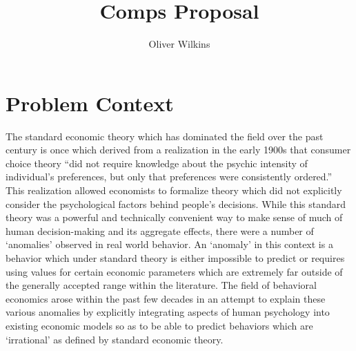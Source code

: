 \documentclass[10pt,twocolumn]{article}
\title{Comps Proposal}
\author{Oliver Wilkins}
\affiliation{Occidental College}
\begin{document}
\maketitle

\section{Problem Context}
The standard economic theory which has dominated the field over the past century is once which derived from a realization in the early 1900s that consumer choice theory “did not require knowledge about the psychic intensity of individual’s preferences, but only that preferences were consistently ordered.”\cite{lehr} This realization allowed economists to formalize theory which did not explicitly consider the psychological factors behind people’s decisions. While this standard theory was a powerful and technically convenient way to make sense of much of human decision-making and its aggregate effects, there were a number of ‘anomalies’ observed in real world behavior. An ‘anomaly’ in this context is a behavior which under standard theory is either impossible to predict or requires using values for certain economic parameters which are extremely far outside of the generally accepted range within the literature. The field of behavioral economics arose within the past few decades in an attempt to explain these various anomalies by explicitly integrating aspects of human psychology into existing economic models so as to be able to predict behaviors which are ‘irrational’ as defined by standard economic theory.
\end{document}
